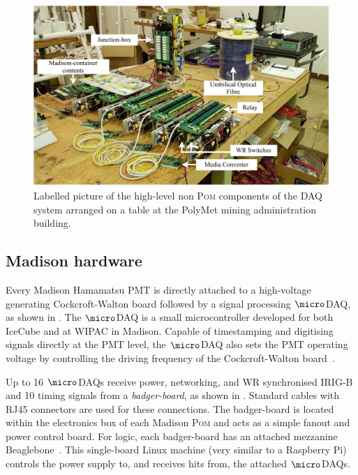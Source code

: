 \begin{figure} %
    \includegraphics[width=\textwidth]{diagrams/5-daq/full_setup.pdf}
    \caption[Labelled picture of the high-level components of the \chipsfive DAQ system]
    {Labelled picture of the high-level non \textsc{Pom} components of the \chipsfive DAQ system
        arranged on a table at the PolyMet mining administration building.}
    \label{fig:full_setup}
\end{figure}

\subsection{Madison hardware} %
\label{sec:daq_hard_madison} %

Every Madison Hamamatsu PMT is directly attached to a high-voltage generating Cockcroft-Walton
board followed by a signal processing $\micro$DAQ, as shown in
. The $\micro$DAQ is a small microcontroller developed for
both IceCube and \chips at WIPAC in Madison. Capable of timestamping and digitising signals
directly at the PMT level, the $\micro$DAQ also sets the PMT operating voltage by controlling the
driving frequency of the Cockcroft-Walton board~\cite{eijk2018}.

Up to 16 $\micro$DAQs receive power, networking, and WR synchronised IRIG-B and
\SI{10}{} timing signals from a \emph{badger-board}, as shown in
. Standard cables with RJ45 connectors are used for these
connections. The badger-board is located within the electronics box of each Madison \textsc{Pom}
and acts as a simple fanout and power control board. For logic, each badger-board has an attached
mezzanine Beaglebone~\cite{beagle2020}. This single-board Linux machine (very similar to a
Raspberry Pi) controls the power supply to, and receives hits from, the attached $\micro$DAQs.


